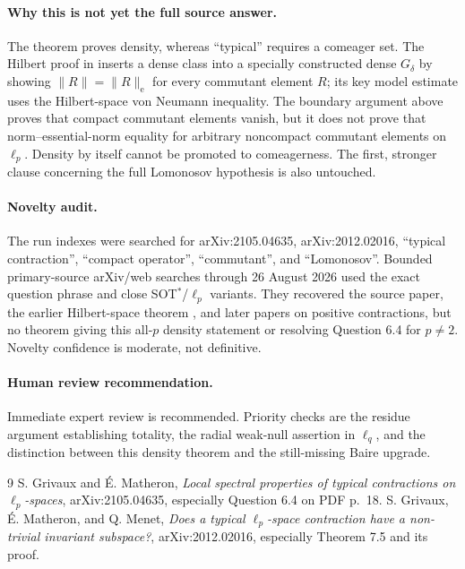 \documentclass[11pt]{article}
\begin{document}
\paragraph{Why this is not yet the full source answer.}
The theorem proves density, whereas ``typical'' requires a comeager set.
The Hilbert proof in \cite{GMM} inserts a dense class into a specially
constructed dense $G_\delta$ by showing
$\|R\|=\|R\|_{\mathrm e}$ for every commutant element $R$; its key model
estimate uses the Hilbert-space von Neumann inequality.  The boundary
argument above proves that compact commutant elements vanish, but it does not
prove that norm--essential-norm equality for arbitrary noncompact commutant
elements on $\ell_p$.  Density by itself cannot be promoted to
comeagerness.  The first, stronger clause concerning the full Lomonosov
hypothesis is also untouched.

\paragraph{Novelty audit.}
The run indexes were searched for arXiv:2105.04635, arXiv:2012.02016,
``typical contraction'', ``compact operator'', ``commutant'', and
``Lomonosov''.  Bounded primary-source arXiv/web searches through 26 August
2026 used the exact question phrase and close SOT$^*$/$\ell_p$ variants.
They recovered the source paper, the earlier Hilbert-space theorem
\cite{GMM}, and later papers on positive contractions, but no theorem giving
this all-$p$ density statement or resolving Question 6.4 for $p\ne2$.
Novelty confidence is moderate, not definitive.

\paragraph{Human review recommendation.}
Immediate expert review is recommended.  Priority checks are the residue
argument establishing totality, the radial weak-null assertion in $\ell_q$,
and the distinction between this density theorem and the still-missing Baire
upgrade.

\begin{thebibliography}{9}
 S. Grivaux and É. Matheron,
\emph{Local spectral properties of typical contractions on $\ell_p$-spaces},
arXiv:2105.04635, especially Question 6.4 on PDF p.~18.
 S. Grivaux, É. Matheron, and Q. Menet,
\emph{Does a typical $\ell_p$-space contraction have a non-trivial invariant
subspace?}, arXiv:2012.02016, especially Theorem 7.5 and its proof.
\end{thebibliography}
\end{document}
